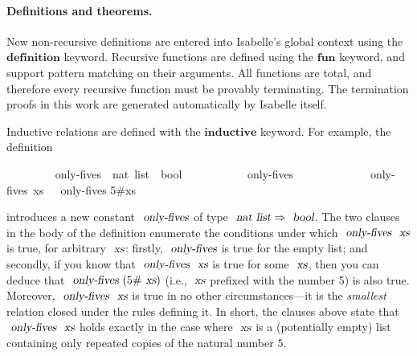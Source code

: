 \paragraph{Definitions and theorems.}

New non-recursive definitions are entered into Isabelle's global context using the $\mathbf{definition}$ keyword.
Recursive functions are defined using the $\mathbf{fun}$ keyword, and support pattern matching on their arguments.
All functions are total, and therefore every recursive function must be provably terminating.
The termination proofs in this work are generated automatically by Isabelle itself.

Inductive relations are defined with the $\mathbf{inductive}$ keyword.
For example, the definition
\vspace{0.35em}
\begin{isabellebody}
\ \ \ \ \ \ \ \  only-fives\ {\isacharcolon}{\isacharcolon}\ {\isachardoublequoteopen}nat\ list\ {\isasymRightarrow}\ bool{\isachardoublequoteclose}\ \isanewline
\ \ \ \ \ \ \ \ \ \ {\isachardoublequoteopen}only-fives\ {\isacharbrackleft}{\isacharbrackright}{\isachardoublequoteclose}\ {\isacharbar}\isanewline
\ \ \ \ \ \ \ \ \ \ {\isachardoublequoteopen}{\isasymlbrakk}\ only-fives\ xs\ {\isasymrbrakk}\ {\isasymLongrightarrow}\ only-fives {\isacharparenleft}5\#xs{\isacharparenright}{\isachardoublequoteclose}
\end{isabellebody}
\vspace{0.35em}
\noindent
introduces a new constant $\isa{only-fives}$ of type $\isa{nat list} \Rightarrow \isa{bool}$.
The two clauses in the body of the definition enumerate the conditions under which $\isa{only-fives}\ \isa{xs}$ is true, for arbitrary $\isa{xs}$: firstly, $\isa{only-fives}$ is true for the empty list; and secondly, if you know that $\isa{only-fives}\ \isa{xs}$ is true for some $\isa{xs}$, then you can deduce that $\isa{only-fives}\ (5\#\isa{xs})$ (i.e., $\isa{xs}$ prefixed with the number 5) is also true.
Moreover, $\isa{only-fives}\ \isa{xs}$ is true in no other circumstances---it is the \emph{smallest} relation closed under the rules defining it.
In short, the clauses above state that $\isa{only-fives}\ \isa{xs}$ holds exactly in the case where $\isa{xs}$ is a (potentially empty) list containing only repeated copies of the natural number $5$.

